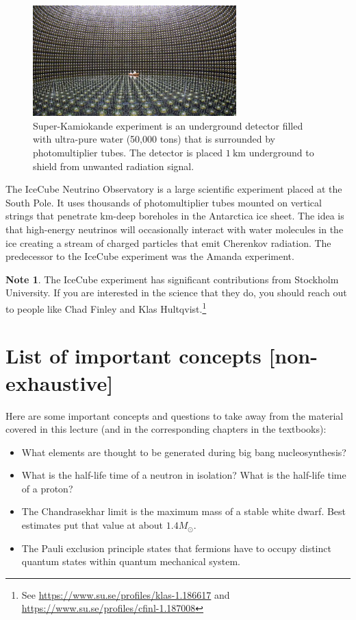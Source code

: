 \documentclass[a4paper,12pt]{article}
\theoremstyle{remark}
\newcommand{\mrm}[1]{\mathrm{#1}}
\renewcommand{\=}[1]{\stackrel{#1}{=}} %
\newcommand{\linkc}[1]{\textcolor{linkc}{#1}}
\theoremstyle{plain}
\theoremstyle{definition}
\newtheorem*{definitionT}{Note}%
\newenvironment{note}{
\begin{dBox}
\begin{definitionT}}
{\end{definitionT}
\end{dBox}}
\begin{document}
\begin{figure}[t]
\begin{center}
    \includegraphics*[angle=0,width=0.7\textwidth]{img/superkami.jpg}
    \caption[Super Kamiokande experiment]{Super-Kamiokande experiment is an underground detector filled with ultra-pure water (50,000 tons) that is surrounded by photomultiplier tubes. The detector is placed $1 \:\mrm{km}$ underground to shield from unwanted radiation signal.}
\label{fig:skamiokande}
\end{center}
\end{figure}

The IceCube Neutrino Observatory is a large scientific experiment placed at the South Pole. It uses thousands of photomultiplier tubes mounted on vertical strings that penetrate km-deep boreholes in the Antarctica ice sheet. The idea is that high-energy neutrinos will occasionally interact with water molecules in the ice creating a stream of charged particles that emit Cherenkov radiation. The predecessor to the IceCube experiment was the Amanda experiment.

\begin{note}
The IceCube experiment has significant contributions from Stockholm University. If you are interested in the science that they do, you should reach out to people like Chad Finley and Klas Hultqvist.\footnote{See \href{https://www.su.se/profiles/klas-1.186617}{\linkc{https://www.su.se/profiles/klas-1.186617}} and \href{https://www.su.se/profiles/cfinl-1.187008}{\linkc{https://www.su.se/profiles/cfinl-1.187008}}}
\end{note}


\section{List of important concepts [non-exhaustive]}
Here are some important concepts and questions to take away from the material covered in this lecture (and in the corresponding chapters in the textbooks):
\vspace{-7mm}
\begin{itemize}
\item What elements are thought to be generated during big bang nucleosynthesis?
\item What is the half-life time of a neutron in isolation? What is the half-life time of a proton?
\item The Chandrasekhar limit is the maximum mass of a stable white dwarf. Best estimates put that value at about $1.4 M_\odot$.
\item The Pauli exclusion principle states that fermions have to occupy distinct quantum states within quantum mechanical system. 
\end{itemize}

\begingroup
%
%

%
\linespread{0.5}\selectfont


\endgroup
\end{document}
